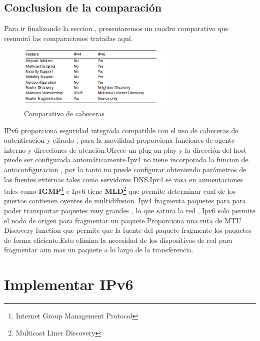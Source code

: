 \documentclass[11pt,a4paper]{article}
\begin{document}
\subsection{Conclusion de la comparación}
Para ir finalizando la seccion , presentaremos un cuadro comparativo que resumirá las comparaciones tratadas aquí.


\begin{figure}[h!]
 \centering
 \includegraphics[width=0.71\textwidth]{comp.png}
 \caption[Asignacion de prefijo]{Comparativo de cabeceras }
\end{figure} \par

IPv6 proporciona seguridad integrada compatible con el uso de cabeceras de autenticacion y cifrado , para la movilidad proporciona funciones de agente interno y direcciones de atención.Ofrece un plug an play y la dirección del host puede ser configurada automáticamente.Ipv4 no tiene incorporada la funcion de autoconfiguracion , por lo tanto no puede configurar obteniendo parámetros de las fuentes externas tales como servidores DNS.Ipv4 se vasa en aumentaciones tales como \textbf{IGMP}\footnote{Internet Group Management Protocol} e Ipv6 tiene \textbf{MLD}\footnote{Multicast Liner Discovery} que permite determinar cual de los puertos contienen oyentes de multidifusion.
Ipv4 fragmenta paquetes para para poder transportar paquetes muy grandes , lo que satura la red , Ipv6 solo permite el nodo de origen para fragmentar un paquete.Proporciona una ruta de MTU Discovery function que permite que la fuente del paquete fragmente los paquetes de forma eficiente.Esto elimina la necesidad de los dispositivos de red para fragmentar aun mas un paquete a lo largo de la transferencia.
\section{Implementar IPv6}
\end{document}
